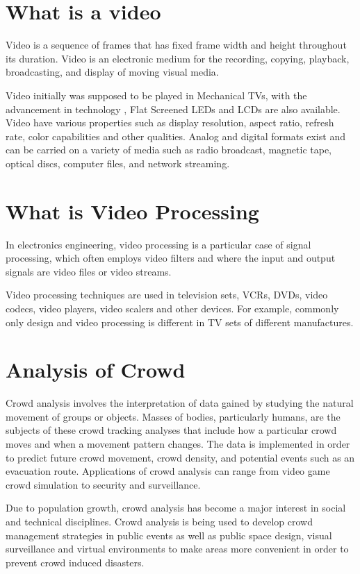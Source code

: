 \section{What is a video}
Video is a sequence of frames that has fixed frame width and height throughout its duration.
Video is an electronic medium for the recording, copying, playback,
broadcasting, and display of moving visual media.
\par
Video initially was supposed to be played in Mechanical TVs, with the advancement in technology , Flat Screened LEDs and LCDs are also available. Video have various properties such as display resolution, aspect ratio,
refresh rate, color capabilities and other qualities. Analog and digital formats exist and
can be carried on a variety of media such as radio broadcast, magnetic tape, optical
discs, computer files, and network streaming.

\section{What is Video Processing}
In electronics engineering, video processing is a particular case of signal
processing, which often employs video filters and where the input and output signals are
video files or video streams. \par Video processing techniques are used in television sets,
VCRs, DVDs, video codecs, video players, video scalers and other devices. For example, commonly
 only design and video processing is different in TV sets of
different manufactures.

\section{Analysis of Crowd}
Crowd analysis involves the interpretation of data gained by studying the natural
movement of groups or objects. Masses of bodies, particularly humans, are the subjects
of these crowd tracking analyses that include how a particular crowd moves and when a
movement pattern changes. The data is implemented in order to predict future crowd
movement, crowd density, and potential events such as an evacuation route.
Applications of crowd analysis can range from video game crowd simulation to security
and surveillance.
\par
Due to population growth, crowd analysis has become a major interest in social
and technical disciplines. Crowd analysis is being used to develop crowd management
strategies in public events as well as public space design, visual surveillance and virtual
environments to make areas more convenient in order to prevent crowd induced
disasters.
